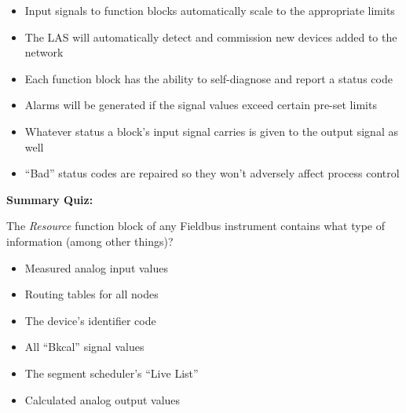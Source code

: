 \begin{itemize}
\item{} Input signals to function blocks automatically scale to the appropriate limits
\vskip 5pt 
\item{} The LAS will automatically detect and commission new devices added to the network
\vskip 5pt 
\item{} Each function block has the ability to self-diagnose and report a status code
\vskip 5pt 
\item{} Alarms will be generated if the signal values exceed certain pre-set limits
\vskip 5pt 
\item{} Whatever status a block's input signal carries is given to the output signal as well
\vskip 5pt 
\item{} ``Bad'' status codes are repaired so they won't adversely affect process control
\end{itemize}










\vfil \eject

\noindent
{\bf Summary Quiz:}

The {\it Resource} function block of any Fieldbus instrument contains what type of information (among other things)?

\begin{itemize}
\item{} Measured analog input values
\vskip 5pt 
\item{} Routing tables for all nodes
\vskip 5pt 
\item{} The device's identifier code
\vskip 5pt 
\item{} All ``Bkcal'' signal values
\vskip 5pt 
\item{} The segment scheduler's ``Live List''
\vskip 5pt 
\item{} Calculated analog output values
\end{itemize}




